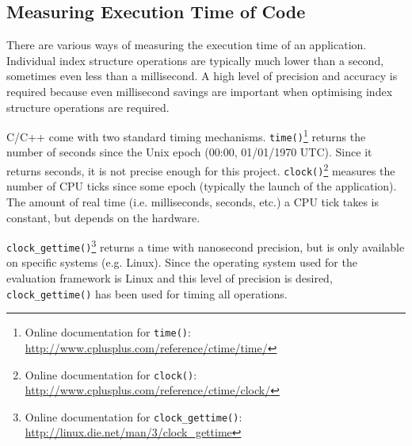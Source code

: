 \subsection{Measuring Execution Time of Code}

There are various ways of measuring the execution time of an application. Individual index structure operations are typically much lower than a second, sometimes even less than a millisecond. A high level of precision and accuracy is required because even millisecond savings are important when optimising index structure operations are required.

C/C++ come with two standard timing mechanisms. \texttt{time()}\footnote{Online documentation for \texttt{time()}: \url{http://www.cplusplus.com/reference/ctime/time/}} returns the number of seconds since the Unix epoch (00:00, 01/01/1970 UTC). Since it returns seconds, it is not precise enough for this project. \texttt{clock()}\footnote{Online documentation for \texttt{clock()}: \url{http://www.cplusplus.com/reference/ctime/clock/}}  measures the number of CPU ticks since some epoch (typically the launch of the application). The amount of real time (i.e. milliseconds, seconds, etc.) a CPU tick takes is constant, but depends on the hardware.

\texttt{clock\_gettime()}\footnote{Online documentation for \texttt{clock\_gettime()}: \url{http://linux.die.net/man/3/clock_gettime}} returns a time with nanosecond precision, but is only available on specific systems (e.g. Linux). Since the operating system used for the evaluation framework is Linux and this level of precision is desired, \texttt{clock\_gettime()} has been used for timing all operations.